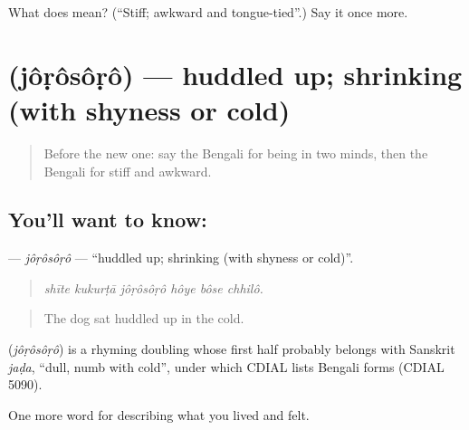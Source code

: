 \begin{tcolorbox}[breakable,colback=teal!4,colframe=teal!35!black,title={Before you move on}]
What does  mean? (\textquotedblleft{}Stiff; awkward and tongue-tied\textquotedblright{}.) Say it once more.
\end{tcolorbox}
\section[\texorpdfstring{\bn{জড়সড়} (jôṛôsôṛô)}{জড়সড় (jôṛôsôṛô)}]{ (jôṛôsôṛô) — huddled up; shrinking (with shyness or cold)}

\label{lesson:BN-C454-jorosoro}



\begin{quote}
Before the new one: say the Bengali for being in two minds, then the Bengali for stiff and awkward.
\end{quote}

\subsection*{You'll want to know: }
\textbf{} — \emph{jôṛôsôṛô} — \textquotedblleft{}huddled up; shrinking (with shyness or cold)\textquotedblright{}.

\begin{quote}
     
\end{quote}

\begin{quote}
\emph{shīte kukurṭā jôṛôsôṛô hôye bôse chhilô.}
\end{quote}

\begin{quote}
The dog sat huddled up in the cold.
\end{quote}

\begin{cousinweb}
\textbf{} (\emph{jôṛôsôṛô}) is a rhyming doubling whose first half probably belongs with Sanskrit \emph{jaḍa}, \textquotedblleft{}dull, numb with cold\textquotedblright{}, under which CDIAL lists Bengali forms (CDIAL 5090).
\end{cousinweb}

\begin{grammarlens}[title={What you've built}]
One more word for describing what you lived and felt.
\end{grammarlens}

